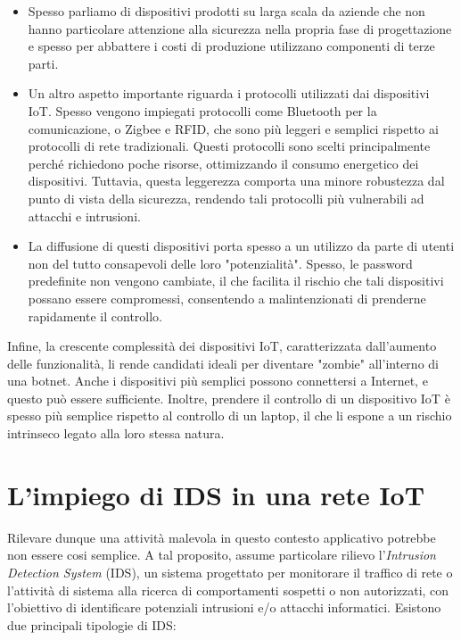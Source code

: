 \begin{itemize}
    \item Spesso parliamo di dispositivi prodotti su larga scala da aziende che non hanno particolare attenzione alla sicurezza nella propria fase di progettazione e spesso per abbattere i costi di produzione utilizzano componenti di terze parti. 
    \item Un altro aspetto importante riguarda i protocolli utilizzati dai dispositivi IoT. Spesso vengono impiegati protocolli come Bluetooth per la comunicazione, o Zigbee e RFID, che sono più leggeri e semplici rispetto ai protocolli di rete tradizionali. Questi protocolli sono scelti principalmente perché richiedono poche risorse, ottimizzando il consumo energetico dei dispositivi. Tuttavia, questa leggerezza comporta una minore robustezza dal punto di vista della sicurezza, rendendo tali protocolli più vulnerabili ad attacchi e intrusioni.
    \item La diffusione di questi dispositivi porta spesso a un utilizzo da parte di utenti non del tutto consapevoli delle loro "potenzialità". Spesso, le password predefinite non vengono cambiate, il che facilita il rischio che tali dispositivi possano essere compromessi, consentendo a malintenzionati di prenderne rapidamente il controllo.
\end{itemize}

Infine, la crescente complessità dei dispositivi IoT, caratterizzata dall'aumento delle funzionalità, li rende candidati ideali per diventare "zombie" all'interno di una botnet. Anche i dispositivi più semplici possono connettersi a Internet, e questo può essere sufficiente. Inoltre, prendere il controllo di un dispositivo IoT è spesso più semplice rispetto al controllo di un laptop, il che li espone a un rischio intrinseco legato alla loro stessa natura. \cite{securingIOT}

\section{L'impiego di IDS in una rete IoT}

Rilevare dunque una attività malevola in questo contesto applicativo potrebbe non essere cosi semplice.
A tal proposito, assume particolare rilievo l'\textit{Intrusion Detection System} (IDS), un sistema progettato per monitorare il traffico di rete o l'attività di sistema alla ricerca di comportamenti sospetti o non autorizzati, con l'obiettivo di identificare potenziali intrusioni e/o attacchi informatici. Esistono due principali tipologie di IDS:

